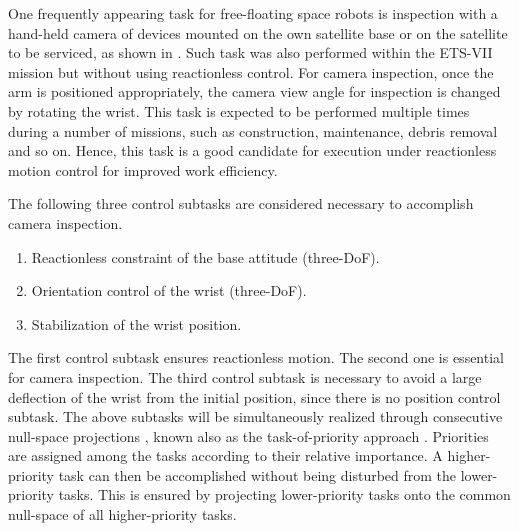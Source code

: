 %
One frequently appearing task for free-floating space robots is inspection with a hand-held camera 
of devices mounted on the own satellite base or on the satellite to be serviced, 
as shown in .
Such task was also performed within the ETS-VII mission \cite{Oda1997} but without using 
reactionless control. For camera inspection, once the arm is positioned appropriately,
the camera view angle for inspection is changed by rotating the wrist.
This task is  expected to be performed multiple times during a number of missions,
such as construction, maintenance, debris removal and so on.
Hence, this task is a good candidate for execution under reactionless motion control
for improved work efficiency.

The following three control subtasks are considered necessary to accomplish  camera inspection.
%
\begin{enumerate}
\item Reactionless constraint of the base attitude (three-DoF).
\item Orientation control of the wrist (three-DoF).
\item Stabilization of the wrist position.
\end{enumerate}
%
The first control subtask ensures reactionless motion. The second one is essential for camera 
inspection. The third control subtask is necessary to avoid a large deflection of the wrist from the 
initial position, since there is no position control subtask.
The above subtasks will be simultaneously realized through  consecutive null-space projections 
\cite{Konstantinov1981, Nakamura1981}, known also as the task-of-priority approach \cite{Nakamura1987}.
Priorities are assigned among the tasks according to their relative importance.
A higher-priority task can then be accomplished without being disturbed  from the lower-priority tasks.
This is ensured by projecting lower-priority tasks onto the common null-space of 
all higher-priority tasks.


